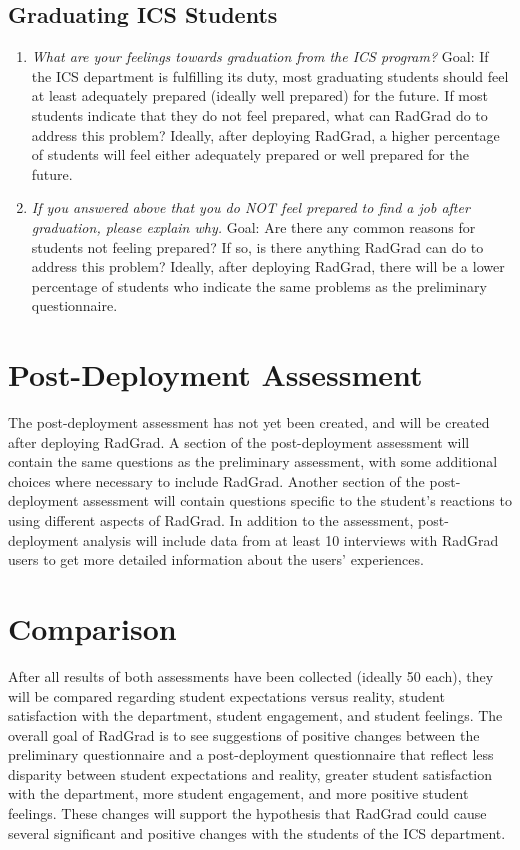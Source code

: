 \subsection{Graduating ICS Students}
\begin{enumerate}
\item \textit{What are your feelings towards graduation from the ICS program?}
Goal: If the ICS department is fulfilling its duty, most graduating students should feel at least adequately prepared (ideally well prepared) for the future. If most students indicate that they do not feel prepared, what can RadGrad do to address this problem? Ideally, after deploying RadGrad, a higher percentage of students will feel either adequately prepared or well prepared for the future.
\item \textit{If you answered above that you do NOT feel prepared to find a job after graduation, please explain why. }
Goal: Are there any common reasons for students not feeling prepared? If so, is there anything RadGrad can do to address this problem? Ideally, after deploying RadGrad, there will be a lower percentage of students who indicate the same problems as the preliminary questionnaire. 
\end{enumerate}

\section{Post-Deployment Assessment}
The post-deployment assessment has not yet been created, and will be created after deploying RadGrad. A section of the post-deployment assessment will contain the same questions as the preliminary assessment, with some additional choices where necessary to include RadGrad. Another section of the post-deployment assessment will contain questions specific to the student's reactions to using different aspects of RadGrad. In addition to the assessment, post-deployment analysis will include data from at least 10 interviews with RadGrad users to get more detailed information about the users' experiences.

\section{Comparison}
After all results of both assessments have been collected (ideally 50 each), they will be compared regarding student expectations versus reality, student satisfaction with the department, student engagement, and student feelings. The overall goal of RadGrad is to see suggestions of positive changes between the preliminary questionnaire and a post-deployment questionnaire that reflect less disparity between student expectations and reality, greater student satisfaction with the department, more student engagement, and more positive student feelings. These changes will support the hypothesis that RadGrad could cause several significant and positive changes with the students of the ICS department.